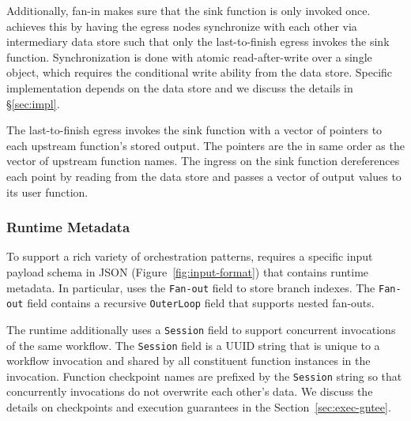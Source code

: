 Additionally, fan-in makes sure that the sink function is only invoked once.
\name{} achieves this by having the egress nodes synchronize with each other
via intermediary data store such that only the last-to-finish egress invokes
the sink function. Synchronization is done with atomic read-after-write over a
single object, which requires the conditional write ability from the data
store. Specific implementation depends on the data store and we discuss the
details in \S\ref{sec:impl}.

The last-to-finish egress invokes the sink function with a vector of pointers
to each upstream function's stored output. The pointers are the in same order
as the vector of upstream function names. The ingress on the sink function
dereferences each point by reading from the data store and passes a vector of
output values to its user function.


\subsubsection{Runtime Metadata}

To support a rich variety of orchestration patterns, \name{} requires a
specific input payload schema in JSON (Figure~\ref{fig:input-format}) that
contains \name{} runtime metadata. In particular, \name{} uses the
\texttt{Fan-out} field to store branch indexes. The \texttt{Fan-out} field
contains a recursive \texttt{OuterLoop} field that supports nested fan-outs.

The runtime additionally uses a \texttt{Session} field to support concurrent
invocations of the same workflow. The \texttt{Session} field is a UUID string
that is unique to a workflow invocation and shared by all constituent function
instances in the invocation. Function checkpoint names are prefixed by the \texttt{Session} string so that
concurrently invocations do not overwrite each other's data. We discuss the details on
\name{} checkpoints and execution guarantees in the Section~\ref{sec:exec-gntee}.